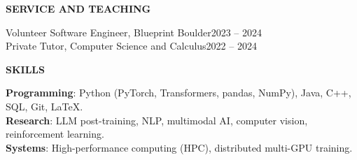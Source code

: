 \documentclass[11pt,letterpaper]{article}
\newcommand{\resumesection}[1]{%
  \par\addvspace{1.25ex}\Needspace{4\baselineskip}%
  {\bfseries #1}\par\nobreak\vspace{0.6ex}%
}
\begin{document}
\resumesection{SERVICE AND TEACHING}
Volunteer Software Engineer, Blueprint Boulder\hfill 2023 -- 2024\\
Private Tutor, Computer Science and Calculus\hfill 2022 -- 2024

\resumesection{SKILLS}
\textbf{Programming}: Python (PyTorch, Transformers, pandas, NumPy), Java, C++, SQL, Git, \LaTeX.\\
\textbf{Research}: LLM post-training, NLP, multimodal AI, computer vision, reinforcement learning.\\
\textbf{Systems}: High-performance computing (HPC), distributed multi-GPU training.
\end{document}

